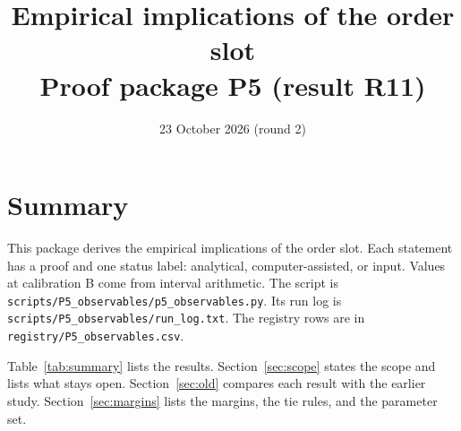 \documentclass[12pt]{article}
\title{Empirical implications of the order slot\\
\large Proof package P5 (result R11)}
\author{}
\date{23 October 2026 (round 2)}
\theoremstyle{definition}
\begin{document}
\maketitle

\section*{Summary}

This package derives the empirical implications of the order slot.
Each statement has a proof and one status label: analytical, computer-assisted, or input.
Values at calibration B come from interval arithmetic.
The script is \texttt{scripts/P5\_observables/p5\_observables.py}.
Its run log is \texttt{scripts/P5\_observables/run\_log.txt}.
The registry rows are in \texttt{registry/P5\_observables.csv}.

Table~\ref{tab:summary} lists the results.
Section~\ref{sec:scope} states the scope and lists what stays open.
Section~\ref{sec:old} compares each result with the earlier study.
Section~\ref{sec:margins} lists the margins, the tie rules, and the parameter set.
\end{document}
